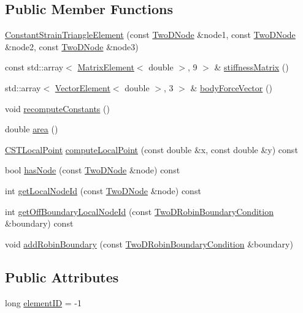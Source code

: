 \subsection*{Public Member Functions}
\begin{DoxyCompactItemize}
\item 
\hyperlink{a00789_aa54c09f1dd7cacaf1f4f0b1428859c00}{Constant\+Strain\+Triangle\+Element} (const \hyperlink{a00210_a92dafcc05a788e1065a5792b67f0f70e}{Two\+D\+Node} \&node1, const \hyperlink{a00210_a92dafcc05a788e1065a5792b67f0f70e}{Two\+D\+Node} \&node2, const \hyperlink{a00210_a92dafcc05a788e1065a5792b67f0f70e}{Two\+D\+Node} \&node3)
\item 
const std\+::array$<$ \hyperlink{a00210_a1a12603621e7a1efa59ac5cb79f9d509}{Matrix\+Element}$<$ double $>$, 9 $>$ \& \hyperlink{a00789_a6da0892a84128d73e1186aeb69a37723}{stiffness\+Matrix} ()
\item 
std\+::array$<$ \hyperlink{a00210_a08f01d4bb892cf7b2386d0f3a8643d72}{Vector\+Element}$<$ double $>$, 3 $>$ \& \hyperlink{a00789_ae0795172aa1ee5ffc68ec0e2c4aab9cc}{body\+Force\+Vector} ()
\item 
void \hyperlink{a00789_a40cf9432221b62db76e8b154e3e81e3d}{recompute\+Constants} ()
\item 
double \hyperlink{a00789_acd197716c6bffaa3c7b472661f0e5ca4}{area} ()
\item 
\hyperlink{a00210_a124b14f4255dab47a3f7235a02cc65ee}{C\+S\+T\+Local\+Point} \hyperlink{a00789_a772e106e996b0d757332ca59b9c7f159}{compute\+Local\+Point} (const double \&x, const double \&y) const
\item 
bool \hyperlink{a00789_acf4734f5fbc56b700c29d637baf78b9f}{has\+Node} (const \hyperlink{a00210_a92dafcc05a788e1065a5792b67f0f70e}{Two\+D\+Node} \&node) const
\item 
int \hyperlink{a00789_aaec00b05b8a6af567d2f5b39b1bb5611}{get\+Local\+Node\+Id} (const \hyperlink{a00210_a92dafcc05a788e1065a5792b67f0f70e}{Two\+D\+Node} \&node) const
\item 
int \hyperlink{a00789_ae6dcd71f0f120db54cf96e3c2c4cf770}{get\+Off\+Boundary\+Local\+Node\+Id} (const \hyperlink{a00805}{Two\+D\+Robin\+Boundary\+Condition} \&boundary) const
\item 
void \hyperlink{a00789_a7f4a8e6d0fece8943963f615caf70f09}{add\+Robin\+Boundary} (const \hyperlink{a00805}{Two\+D\+Robin\+Boundary\+Condition} \&boundary)
\end{DoxyCompactItemize}
\subsection*{Public Attributes}
\begin{DoxyCompactItemize}
\item 
long \hyperlink{a00789_a5feb92c27270536c92fcb39c6fecc00d}{element\+ID} = -\/1
\end{DoxyCompactItemize}
